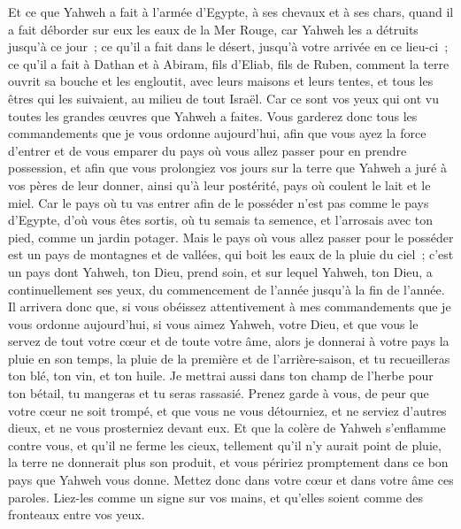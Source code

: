 \begin{multicols}{2}
Et ce que Yahweh a fait à l'armée d'Egypte, à ses chevaux et à ses chars, quand il a fait déborder sur eux les eaux de la Mer Rouge, car Yahweh les a détruits jusqu'à ce jour~;
ce qu'il a fait dans le désert, jusqu'à votre arrivée en ce lieu-ci~;
ce qu'il a fait à Dathan et à Abiram, fils d'Eliab, fils de Ruben, comment la terre ouvrit sa bouche et les engloutit, avec leurs maisons et leurs tentes, et tous les êtres qui les suivaient, au milieu de tout Israël.
Car ce sont vos yeux qui ont vu toutes les grandes œuvres que Yahweh a faites.
Vous garderez donc tous les commandements que je vous ordonne aujourd'hui, afin que vous ayez la force d'entrer et de vous emparer du pays où vous allez passer pour en prendre possession,
et afin que vous prolongiez vos jours sur la terre que Yahweh a juré à vos pères de leur donner, ainsi qu'à leur postérité, pays où coulent le lait et le miel.
Car le pays où tu vas entrer afin de le posséder n'est pas comme le pays d'Egypte, d'où vous êtes sortis, où tu semais ta semence, et l'arrosais avec ton pied, comme un jardin potager.
Mais le pays où vous allez passer pour le posséder est un pays de montagnes et de vallées, qui boit les eaux de la pluie du ciel~;
c'est un pays dont Yahweh, ton Dieu, prend soin, et sur lequel Yahweh, ton Dieu, a continuellement ses yeux, du commencement de l'année jusqu'à la fin de l'année.
Il arrivera donc que, si vous obéissez attentivement à mes commandements que je vous ordonne aujourd'hui, si vous aimez Yahweh, votre Dieu, et que vous le servez de tout votre cœur et de toute votre âme,
alors je donnerai à votre pays la pluie en son temps, la pluie de la première et de l'arrière-saison, et tu recueilleras ton blé, ton vin, et ton huile.
Je mettrai aussi dans ton champ de l'herbe pour ton bétail, tu mangeras et tu seras rassasié.
Prenez garde à vous, de peur que votre cœur ne soit trompé, et que vous ne vous détourniez, et ne serviez d'autres dieux, et ne vous prosterniez devant eux.
Et que la colère de Yahweh s'enflamme contre vous, et qu'il ne ferme les cieux, tellement qu'il n'y aurait point de pluie, la terre ne donnerait plus son produit, et vous péririez promptement dans ce bon pays que Yahweh vous donne.
Mettez donc dans votre cœur et dans votre âme ces paroles. Liez-les comme un signe sur vos mains, et qu'elles soient comme des fronteaux entre vos yeux.

\end{multicols}
